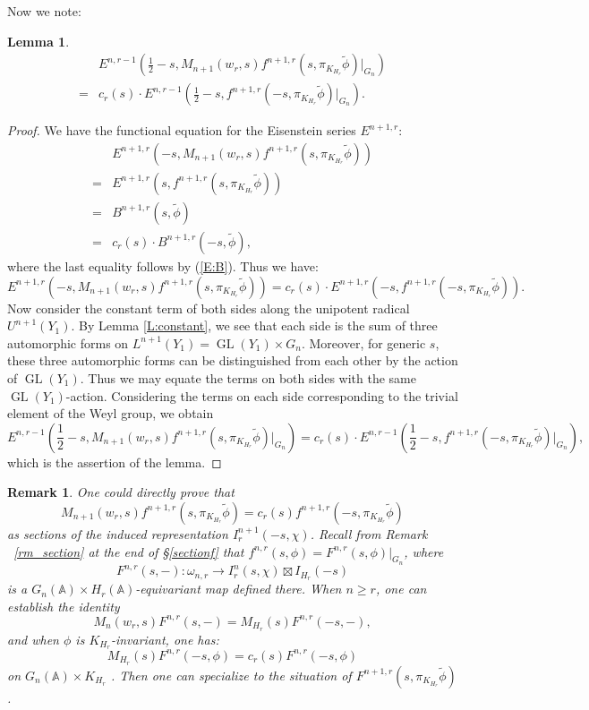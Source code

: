\documentclass[10pt]{amsart}
\theoremstyle{plain}
\newtheorem{Lem}[equation]{Lemma}
\newtheorem{Rmk}[equation]{Remark}
\numberwithin{equation}{section}
\begin{document}
Now we note:
    
\begin{Lem}  \label{L:comm}
\begin{align*}
& E^{n,r-1}(\frac{1}{2}-s, M_{n+1}(w_r, s)  f^{n+1,r}(s,
\pi_{K_{H_r}} \tilde{\phi})|_{G_{n}})\\
=&c_r(s) \cdot E^{n, r-1}(\frac{1}{2}-s,    f^{n+1,r}(-s,
\pi_{K_{H_r}} \tilde{\phi})|_{G_{n}}).
\end{align*}
 \end{Lem}
 \begin{proof}
 We have the functional equation for the Eisenstein series $E^{n+1,r}$:
 \begin{align*}
&E^{n+1,r}(-s,  M_{n+1}(w_{r}, s)  f^{n+1,r}(s, \pi_{K_{H_r}}
  \tilde{\phi}))\\
=& E^{n+1,r}(s,  f^{n+1,r}(s, \pi_{K_{H_r}} \tilde{\phi}))\\
=& B^{n+1, r}(s, \tilde{\phi}) \\
=& c_r(s) \cdot B^{n+1,r}(-s,\tilde{\phi}),
\end{align*}
where the last equality follows by  (\ref{E:B}). Thus we have:
\[  E^{n+1,r}(-s,  M_{n+1}(w_{r}, s)  f^{n+1,r}(s, \pi_{K_{H_r}}
\tilde{\phi}))  =     c_r(s) \cdot   E^{n+1,r}(-s,   f^{n+1,r}(-s,
\pi_{K_{H_r}} \tilde{\phi})). \]
Now consider the constant term of both sides along the unipotent
radical $U^{n+1}(Y_1)$. By Lemma \ref{L:constant}, we see that each
side is the sum of three automorphic forms on $L^{n+1}(Y_1) = {\operatorname{GL}}(Y_1)
\times G_n$. Moreover, for generic $s$, these three automorphic forms
can be distinguished from each other by the action of ${\operatorname{GL}}(Y_1)$.
Thus we may equate the terms on both sides with the same
${\operatorname{GL}}(Y_1)$-action. Considering the terms on each side corresponding to
the trivial element of the Weyl group, we obtain
  \[  E^{n,r-1}(\frac{1}{2}-s, M_{n+1}(w_r, s)  f^{n+1,r}(s,
  \pi_{K_{H_r}} \tilde{\phi})|_{G_{n}})
  = c_r(s) \cdot E^{n, r-1}(  \frac{1}{2}-s,    f^{n+1,r}(-s,
  \pi_{K_{H_r}} \tilde{\phi})|_{G_{n}}),  \]
  which is the assertion of the lemma.
\end{proof}

\begin{Rmk} One could directly prove  that 
\[  M_{n+1}(w_r, s)  f^{n+1,r}(s,\pi_{K_{H_r}} \tilde{\phi})=c_r(s)  f^{n+1,r}(-s, \pi_{K_{H_r}} \tilde{\phi}) \] 
as sections of the induced representation $I^{n+1}_r(-s,\chi)$. Recall  from Remark ~\ref{rm_section} at the end of \S  \ref{sectionf} that $f^{n,r}(s,\phi)=F^{n,r}(s,\phi)|_{G_n}$, where   
\[ F^{n,r}(s,-) : \omega_{n,r} \longrightarrow I^{n}_r(s,\chi)\boxtimes I_{H_r}(-s) \]
is a $G_{n}({\mathbb{A}})\times H_r({\mathbb{A}})$-equivariant map defined there. When $n\geq r$, one can establish the identity 
\[  M_{n}(w_r,s)F^{{n},r}(s, - )=M_{H_r}(s)F^{{n},r}(-s,- ), \]
 and when $\phi$ is $K_{H_r}$-invariant, one has:
 \[  M_{H_r}(s)F^{{n},r}(-s,\phi)=c_r(s)F^{n,r}(-s,\phi) \]
 on $G_n({\mathbb{A}})\times K_{H_r}$ . Then one can specialize to the situation of $F^{n+1,r}(s,\pi_{K_{H_r}}\tilde{\phi})$.
\end{Rmk}
\end{document}
